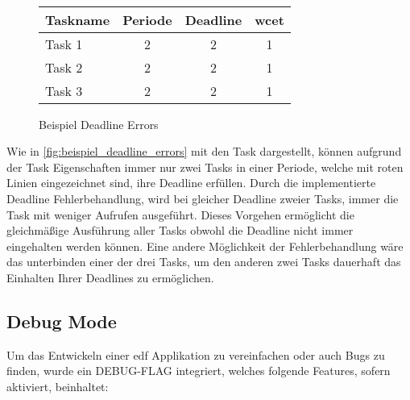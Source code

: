\documentclass[../EDF Master Thesis.tex]{subfiles}
\begin{document}
\begin{figure}[H]
\begin{tikzpicture}
        \end{tikzpicture}\\
        \vspace {1cm}
        \begin{tabular}{l|c|c|c}
            Taskname & Periode & Deadline & \ac{wcet} \\
            \hline
            Task 1 & 2 & 2 & 1 \\
            Task 2 & 2 & 2 & 1 \\
            Task 3 & 2 & 2 & 1 
        \end{tabular}
        \caption{Beispiel Deadline Errors}
        \label{fig:beispiel_deadline_errors}
    \end{figure}

    Wie in \autoref{fig:beispiel_deadline_errors} mit den Task dargestellt, können aufgrund der Task Eigenschaften immer nur zwei Tasks in einer Periode, welche mit roten Linien eingezeichnet sind, ihre Deadline erfüllen.
    Durch die implementierte Deadline Fehlerbehandlung, wird bei gleicher Deadline zweier Tasks, immer die Task mit weniger Aufrufen ausgeführt.
    Dieses Vorgehen ermöglicht die gleichmäßige Ausführung aller Tasks obwohl die Deadline nicht immer eingehalten werden können.
    Eine andere Möglichkeit der Fehlerbehandlung wäre das unterbinden einer der drei Tasks, um den anderen zwei Tasks dauerhaft das Einhalten Ihrer Deadlines zu ermöglichen.

\subsection{Debug Mode} \label{section:debug_mode}

    Um das Entwickeln einer \ac{edf} Applikation zu vereinfachen oder auch Bugs zu finden, wurde ein DEBUG-FLAG integriert, welches folgende Features, sofern aktiviert, beinhaltet:
\end{document}
